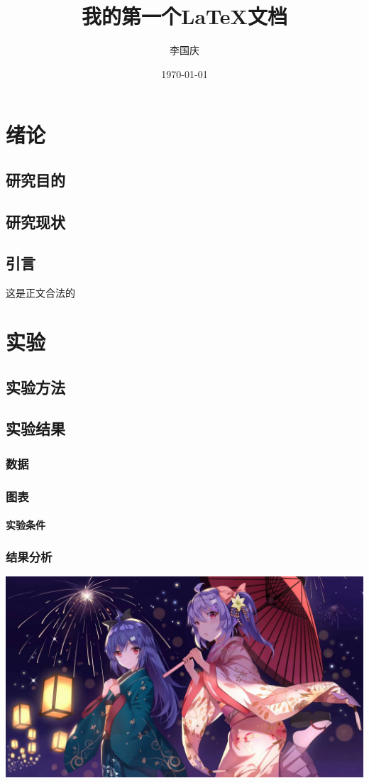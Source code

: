 \documentclass[12pt]{ctexbook}%
\title{\heiti 我的第一个LaTeX文档}
\author{\kaishu 李国庆}
\date{\today}
\begin{document}
	\maketitle %
	\tableofcontents
	\chapter{绪论}
	\section{研究目的}
	\section{研究现状}
	\section{引言}%
	这是正文合法的
	\chapter{实验}
	\section{实验方法}
	\section{实验结果}
	\subsection{数据}%
	\subsection{图表}
	\subsubsection{实验条件}
	\subsection{结果分析}
	\includegraphics[scale=0.17]{a}%
	
\end{document}
